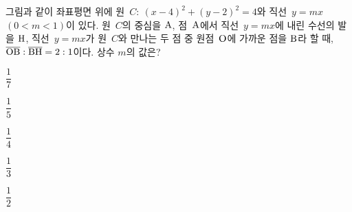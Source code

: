 \noindent\begin{minipage}[t]{0.58\linewidth}\vspace{0pt}\raggedright 그림과 같이 좌표평면 위에 원~$C:\ (x-4)^2+(y-2)^2=4$와 직선~$y=mx$ $(0<m<1)$이 있다. 원~$C$의 중심을 $\mathrm{A}$, 점~$\mathrm{A}$에서 직선~$y=mx$에 내린 수선의 발을 $\mathrm{H}$, 직선~$y=mx$가 원~$C$와 만나는 두 점 중 원점~$\mathrm{O}$에 가까운 점을 $\mathrm{B}$라 할 때, $\overline{\mathrm{OB}}:\overline{\mathrm{BH}}=2:1$이다. 상수 $m$의 값은?\end{minipage}\hfill\begin{minipage}[t]{0.4\linewidth}\vspace{0pt}\centering \resizebox{\ifdim\width>\linewidth\linewidth\else\width\fi}{!}{}\end{minipage}\par
\begin{choices32}{\rule[-3ex]{0pt}{8ex}$\dfrac17$}{\rule[-3ex]{0pt}{8ex}$\dfrac15$}{\rule[-3ex]{0pt}{8ex}$\dfrac14$}{\rule[-3ex]{0pt}{8ex}$\dfrac13$}{\rule[-3ex]{0pt}{8ex}$\dfrac12$}\end{choices32}
